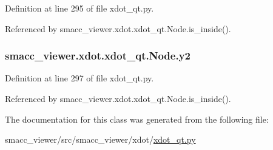 Definition at line 295 of file xdot\+\_\+qt.\+py.



Referenced by smacc\+\_\+viewer.\+xdot.\+xdot\+\_\+qt.\+Node.\+is\+\_\+inside().

\subsubsection[{\texorpdfstring{y2}{y2}}]{\setlength{\rightskip}{0pt plus 5cm}smacc\+\_\+viewer.\+xdot.\+xdot\+\_\+qt.\+Node.\+y2}\hypertarget{classsmacc__viewer_1_1xdot_1_1xdot__qt_1_1Node_ab028844a0751b9ea11e89cc25f6b54cd}{}\label{classsmacc__viewer_1_1xdot_1_1xdot__qt_1_1Node_ab028844a0751b9ea11e89cc25f6b54cd}


Definition at line 297 of file xdot\+\_\+qt.\+py.



Referenced by smacc\+\_\+viewer.\+xdot.\+xdot\+\_\+qt.\+Node.\+is\+\_\+inside().



The documentation for this class was generated from the following file\+:\begin{DoxyCompactItemize}
\item 
smacc\+\_\+viewer/src/smacc\+\_\+viewer/xdot/\hyperlink{xdot__qt_8py}{xdot\+\_\+qt.\+py}\end{DoxyCompactItemize}
